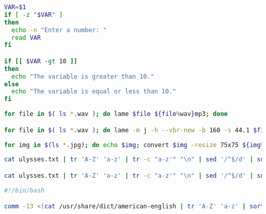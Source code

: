\begin{frame}
\begin{lstlisting}[language=bash, label=lst-bash-if, caption={if else em Bash.}, postbreak=\mbox{$\hookrightarrow$\space}, basicstyle=\fontsize{8}{10}\selectfont\ttfamily]
VAR=$1
if [ -z "$VAR" ]
then
  echo -n "Enter a number: "
  read VAR
fi

if [[ $VAR -gt 10 ]]
then
  echo "The variable is greater than 10."
else
  echo "The variable is equal or less than 10."
fi
\end{lstlisting}

\begin{lstlisting}[language=bash, label=lst-bash-convert-mp3, caption={Converter todos WAVs em MP3.}, postbreak=\mbox{$\hookrightarrow$\space}, basicstyle=\fontsize{8}{10}\selectfont\ttfamily]
for file in $( ls *.wav ); do lame $file ${file%wav}mp3; done

for file in $( ls *.wav ); do lame -m j -h --vbr-new -b 160 -s 44.1 $file -o ${file%wav}mp3; done
\end{lstlisting}

\begin{lstlisting}[language=bash, label=lst-bash-thumbnails, caption={Criar minuaturas de todas fotos.}, postbreak=\mbox{$\hookrightarrow$\space}, basicstyle=\fontsize{8}{10}\selectfont\ttfamily]
for img in $(ls *.jpg); do echo $img; convert $img -resize 75x75 ${img%%.jpg}_thumbnail.jpg; done
\end{lstlisting}

\framebreak

\begin{lstlisting}[language=bash, label=lst-bash-word-freq, caption={Listando as palavras por frequência de ocorrência.}, postbreak=\mbox{$\hookrightarrow$\space}, basicstyle=\fontsize{8}{10}\selectfont\ttfamily]
cat ulysses.txt | tr 'A-Z' 'a-z' | tr -c "a-z'" "\n" | sed '/^$/d' | sort | uniq -c | sort -k1nr -k2 > wordlist.txt

cat ulysses.txt | tr 'A-Z' 'a-z' | tr -c "a-z'" "\n" | sed '/^$/d' | sort | uniq -c | sort -k1nr -k2 | tail -n 100 | pr -c5 -t -w80
\end{lstlisting}

\framebreak

\begin{lstlisting}[language=bash, label=lst-bash-misspelled, caption={Listando as palavras não encontradas no dicionário. Salvar no arquivo \texttt{misspelled.sh}.}, postbreak=\mbox{$\hookrightarrow$\space}, basicstyle=\fontsize{8}{10}\selectfont\ttfamily]
#!/bin/bash

comm -13 <(cat /usr/share/dict/american-english | tr 'A-Z' 'a-z' | sort | uniq) <(cat "${1:-/dev/stdin}" | tr 'A-Z' 'a-z' | tr -c "a-z'" "\n" | sed '/^$/d' | sort | uniq)
\end{lstlisting}


\end{frame}
